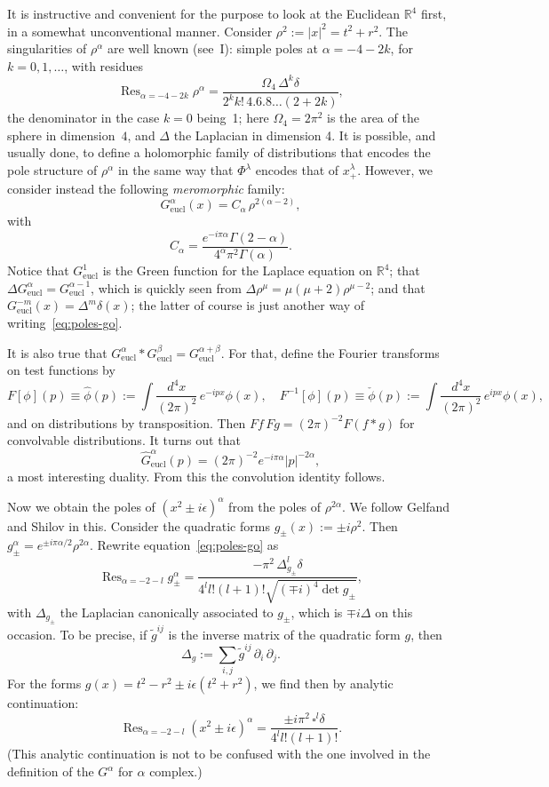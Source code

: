 \documentclass[a4paper,12pt]{article}
\renewcommand{\a}{\alpha}          %
\renewcommand{\b}{\beta}           %
\newcommand{\Dl}{\Delta}           %
\newcommand{\del}{\partial}        %
\newcommand{\dl}{\delta}           %
\newcommand{\eps}{\epsilon}        %
\newcommand{\eucl}{{\mathrm{eucl}}}  %
\newcommand{\Ga}{\Gamma}           %
\newcommand{\la}{\lambda}          %
\newcommand{\Om}{\Omega}           %
\newcommand{\R}{\mathbb{R}}        %
\DeclareMathOperator*{\Res}{Res}   %
\newcommand{\7}{\dagger}           %
\theoremstyle{plain}
\theoremstyle{definition}
\begin{document}
It is instructive and convenient for the purpose to look at the
Euclidean $\R^4$ first, in a somewhat unconventional manner. Consider
$\rho^2 := |x|^2 = t^2+r^2$. The singularities of $\rho^{\a}$ are well
known (see~I): simple poles at $\a = -4-2k$, for $k = 0,1,\dots$, with
residues
\begin{equation}
\Res_{\a=-4-2k} \rho^\a =
\frac{\Om_4\,\Dl^k\dl}{2^k k!\,4.6.8\dots(2+2k)},
\label{eq:poles-go}
\end{equation}
the denominator in the case $k = 0$ being~1; here $\Omega_4=2\pi^2$ is
the area of the sphere in dimension~$4$, and $\Dl$ the Laplacian in
dimension 4. It is possible, and usually done, to define a holomorphic
family of distributions that encodes the pole structure of $\rho^{\a}$
in the same way that $\Phi^\la$ encodes that of $x_+^{\la}$. However,
we consider instead the following \textit{meromorphic} family:
$$
G^\a_\eucl(x) = C_\a\,\rho^{2(\a-2)},
$$
with
$$
C_\a = \frac{e^{-i\pi\a}\Ga(2-\a)}{4^{\a}\pi^2\Ga(\a)}.
$$
Notice that $G^1_\eucl$ is the Green function for the Laplace equation
on $\R^4$; that $\Delta G^\a_\eucl = G^{\a-1}_\eucl$, which is quickly
seen from $\Delta\rho^\mu=\mu(\mu+2)\rho^{\mu-2}$; and that
$G^{-m}_{\eucl}(x) = \Delta^m\dl(x)$; the latter of course is just
another way of writing~\eqref{eq:poles-go}.

It is also true that $G^\a_\eucl * G^\b_\eucl = G^{\a+\b}_\eucl$. For
that, define the Fourier transforms on test functions by
$$
F[\phi](p) \equiv \hat\phi(p) :=
\int\frac{d^4x}{(2\pi)^{2}}\,e^{-ipx}\phi(x),  \quad
F^{-1}[\phi](p) \equiv \check\phi(p) :=
\int\frac{d^4x}{(2\pi)^{2}}\,e^{ipx}\phi(x),
$$
and on distributions by transposition. Then
$Ff\,Fg = (2\pi)^{-2}F(f*g)$ for convolvable distributions. It turns
out \cite[Thm.~5.9]{LiebL} that
\begin{equation}
\hat G^\a_\eucl(p) = (2\pi)^{-2}e^{-i\pi\a}|p|^{-2\a},
\label{eq:Fourier-one}
\end{equation}
a most interesting duality. From this the convolution identity follows.

Now we obtain the poles of $(x^2\pm i\eps)^{\a}$ from the poles of
$\rho^{2\a}$. We follow Gelfand and Shilov
\cite[Ch. III, Secs 2.3, 2.4]{ClassicRussian} in this.
Consider the quadratic forms $g_{\pm}(x) := \pm i\rho^2$. Then
$g_{\pm}^\a = e^{\pm i\pi\a/2} \rho^{2\a}$. Rewrite
equation~\eqref{eq:poles-go} as
$$
\Res_{\a=-2-l} g^\a_\pm =
\frac{-\pi^2\,\Dl^l_{g_{\pm}}\dl}
      {4^l l!(l+1)!\sqrt{(\mp i)^4\det g_{\pm}}},
$$
with $\Dl_{g_{\pm}}$ the Laplacian canonically associated to
$g_{\pm}$, which is $\mp i\Dl$ on this occasion. To be precise, if
${\tilde g}^{ij}$ is the inverse matrix of the quadratic form $g$,
then
$$
\Dl_g := \sum_{i,j} \tilde g^{ij} \,\del_i \,\del_j.
$$
For the forms $g(x) = t^2 - r^2 \pm i\eps(t^2+r^2)$, we find then by
analytic continuation:
$$
\Res_{\a=-2-l} (x^2\pm i\eps)^\a =
\frac{\pm i\pi^2\,\square^l\dl}{4^l l!(l+1)!}.
$$
(This analytic continuation is not to be confused with the one
involved in the definition of the $G^\a$ for $\a$ complex.)
\end{document}
